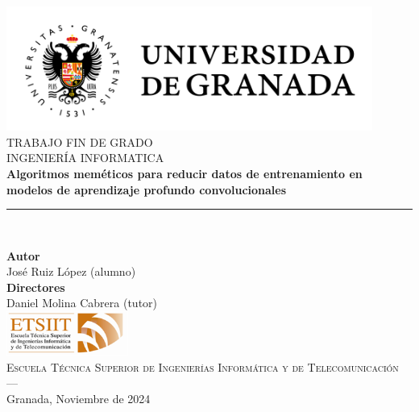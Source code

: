 \begin{titlepage}

 
\newlength{\centeroffset}
\setlength{\centeroffset}{-0.5\oddsidemargin}
\addtolength{\centeroffset}{0.5\evensidemargin}
\thispagestyle{empty}

\noindent\hspace*{\centeroffset}\begin{minipage}{\textwidth}

\centering
\includegraphics[width=0.9\textwidth]{imagenes/logo_ugr.jpg}\\[1.4cm]

\textsc{ \Large TRABAJO FIN DE GRADO\\[0.2cm]}
\textsc{ INGENIERÍA INFORMATICA }\\[1cm]
% 
{\Huge\bfseries Algoritmos meméticos para reducir datos de entrenamiento en modelos de aprendizaje profundo convolucionales\\
}
\vspace{0.2cm}
\noindent\rule[-1ex]{\textwidth}{3pt}\\[3.5ex]

\vspace{0.4cm}

\textbf{Autor}\\ {José Ruiz López (alumno)}\\[2.5ex]
\textbf{Directores}\\
{Daniel Molina Cabrera (tutor)}\\
\vspace{0.6cm}
\includegraphics[width=0.3\textwidth]{imagenes/etsiit_logo.png}\\[0.1cm]
\textsc{Escuela Técnica Superior de Ingenierías Informática y de Telecomunicación}\\
\textsc{---}\\
Granada, Noviembre de 2024
\end{minipage}
\end{titlepage}


